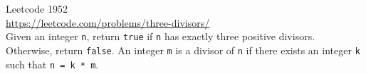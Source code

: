   Leetcode 1952\\
  \url{https://leetcode.com/problems/three-divisors/}\\
  Given an integer \verb!n!, return \verb!true! if \verb!n! has exactly three
  positive divisors. Otherwise, return \verb!false!.
  An integer \verb!m! is a divisor of \verb!n!
  if there exists an integer \verb!k! such that \verb!n = k * m!.
